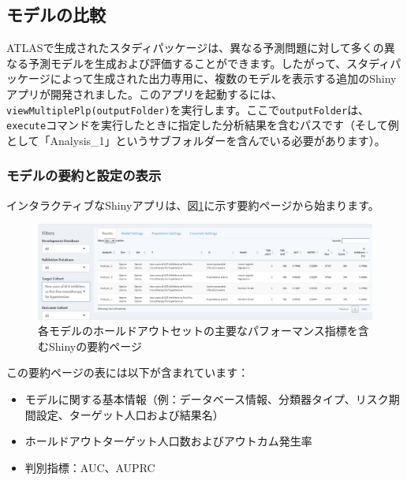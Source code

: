 \documentclass[
  11pt]{book}
\providecommand{\tightlist}{%
  \setlength{\itemsep}{0pt}\setlength{\parskip}{0pt}}
\theoremstyle{definition}
\theoremstyle{definition}
\theoremstyle{definition}
\theoremstyle{definition}
\theoremstyle{remark}
\begin{document}
\subsection{モデルの比較}\label{ux30e2ux30c7ux30ebux306eux6bd4ux8f03}

ATLASで生成されたスタディパッケージは、異なる予測問題に対して多くの異なる予測モデルを生成および評価することができます。したがって、スタディパッケージによって生成された出力専用に、複数のモデルを表示する追加のShinyアプリが開発されました。このアプリを起動するには、\texttt{viewMultiplePlp(outputFolder)}を実行します。ここで\texttt{outputFolder}は、\texttt{execute}コマンドを実行したときに指定した分析結果を含むパスです（そして例として「Analysis\_1」というサブフォルダーを含んでいる必要があります）。

\subsubsection*{モデルの要約と設定の表示}\label{ux30e2ux30c7ux30ebux306eux8981ux7d04ux3068ux8a2dux5b9aux306eux8868ux793a}

インタラクティブなShinyアプリは、図\ref{fig:multiShinySummary}に示す要約ページから始まります。

\begin{figure}

{\centering \includegraphics[width=1\linewidth]{images/PatientLevelPrediction/shiny/shinyFilter} 

}

\caption{各モデルのホールドアウトセットの主要なパフォーマンス指標を含むShinyの要約ページ}\label{fig:multiShinySummary}
\end{figure}

この要約ページの表には以下が含まれています：

\begin{itemize}
\tightlist
\item
  モデルに関する基本情報（例：データベース情報、分類器タイプ、リスク期間設定、ターゲット人口および結果名）
\item
  ホールドアウトターゲット人口数およびアウトカム発生率
\item
  判別指標：AUC、AUPRC
\end{itemize}
\end{document}
